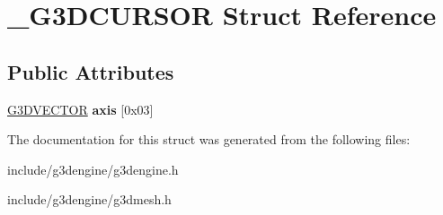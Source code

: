 \hypertarget{struct__G3DCURSOR}{}\section{\+\_\+\+G3\+D\+C\+U\+R\+S\+OR Struct Reference}
\label{struct__G3DCURSOR}
\subsection*{Public Attributes}
\begin{DoxyCompactItemize}
\item 
\mbox{\label{struct__G3DCURSOR_a61007713a2e09a5eb79f23afd6b3570e}} 
\hyperlink{structG3DVECTOR}{G3\+D\+V\+E\+C\+T\+OR} {\bfseries axis} \mbox{[}0x03\mbox{]}
\end{DoxyCompactItemize}


The documentation for this struct was generated from the following files\+:\begin{DoxyCompactItemize}
\item 
include/g3dengine/g3dengine.\+h\item 
include/g3dengine/g3dmesh.\+h\end{DoxyCompactItemize}
